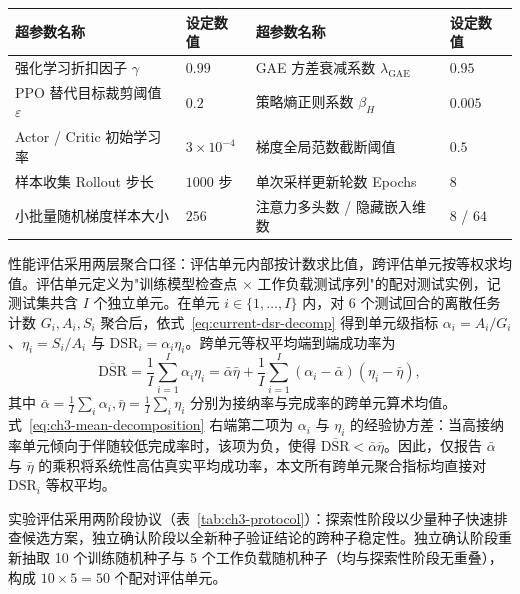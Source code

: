 \begin{table}[!htbp]
    \centering
    \label{tab:ch3-ppo}
    \footnotesize
    \begin{tabular}{llll}
        \toprule
        超参数名称 & 设定数值 & 超参数名称 & 设定数值 \\
        \midrule
        强化学习折扣因子 $\gamma$ & $0.99$ & GAE 方差衰减系数 $\lambda_{\mathrm{GAE}}$ & $0.95$ \\
        PPO 替代目标裁剪阈值 $\varepsilon$ & $0.2$ & 策略熵正则系数 $\beta_H$ & $0.005$ \\
        Actor / Critic 初始学习率 & $3\times 10^{-4}$ & 梯度全局范数截断阈值 & $0.5$ \\
        样本收集 Rollout 步长 & $1000$ 步 & 单次采样更新轮数 Epochs & $8$ \\
        小批量随机梯度样本大小 & $256$ & 注意力多头数 / 隐藏嵌入维数 & $8$ / $64$ \\
        \bottomrule
    \end{tabular}
\end{table}

性能评估采用两层聚合口径：评估单元内部按计数求比值，跨评估单元按等权求均值。评估单元定义为"训练模型检查点 $\times$ 工作负载测试序列"的配对测试实例，记测试集共含 $I$ 个独立单元。在单元 $i \in \{1, \dots, I\}$ 内，对 6 个测试回合的离散任务计数 $G_i, A_i, S_i$ 聚合后，依式~\eqref{eq:current-dsr-decomp} 得到单元级指标 $\alpha_i = A_i / G_i$、$\eta_i = S_i / A_i$ 与 $\mathrm{DSR}_i = \alpha_i \eta_i$。跨单元等权平均端到端成功率为
\begin{equation}
    \overline{\mathrm{DSR}} = \frac{1}{I} \sum_{i=1}^I \alpha_i \eta_i = \bar\alpha \bar\eta + \frac{1}{I}\sum_{i=1}^I (\alpha_i - \bar\alpha)(\eta_i - \bar\eta),
    \label{eq:ch3-mean-decomposition}
\end{equation}
其中 $\bar\alpha = \frac{1}{I}\sum_i \alpha_i, \bar\eta = \frac{1}{I}\sum_i \eta_i$ 分别为接纳率与完成率的跨单元算术均值。式~\eqref{eq:ch3-mean-decomposition} 右端第二项为 $\alpha_i$ 与 $\eta_i$ 的经验协方差：当高接纳率单元倾向于伴随较低完成率时，该项为负，使得 $\overline{\mathrm{DSR}} < \bar\alpha\bar\eta$。因此，仅报告 $\bar\alpha$ 与 $\bar\eta$ 的乘积将系统性高估真实平均成功率，本文所有跨单元聚合指标均直接对 $\mathrm{DSR}_i$ 等权平均。

实验评估采用两阶段协议（表~\ref{tab:ch3-protocol}）：探索性阶段以少量种子快速排查候选方案，独立确认阶段以全新种子验证结论的跨种子稳定性。独立确认阶段重新抽取 10 个训练随机种子与 5 个工作负载随机种子（均与探索性阶段无重叠），构成 $10\times5=50$ 个配对评估单元。


